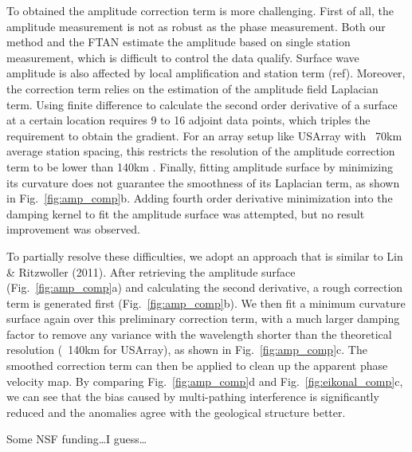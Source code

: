 \documentclass[referee]{gji}
\begin{document}
To obtained the amplitude correction term is more challenging. First of all, the amplitude measurement is not as robust as the phase measurement. Both our method and the FTAN estimate the amplitude based on single station measurement, which is difficult to control the data qualify. Surface wave amplitude is also affected by local amplification and station term (ref). Moreover, the correction term  relies on the estimation of the amplitude field Laplacian term. Using finite difference to calculate the second order derivative of a surface at a certain location requires 9 to 16 adjoint data points, which triples the requirement to obtain the gradient. For an array setup like USArray with ~70km average station spacing, this restricts the resolution of the amplitude correction term to be lower than 140km \cite{Lin:2011fw}. Finally, fitting amplitude surface by minimizing its curvature does not guarantee the smoothness of its Laplacian term, as shown in Fig.~\ref{fig:amp_comp}b. Adding fourth order derivative minimization into the damping kernel to fit the amplitude surface was attempted, but no result improvement was observed.

To partially resolve these difficulties, we adopt an approach that is similar to Lin \& Ritzwoller (2011). After retrieving the amplitude surface (Fig.~\ref{fig:amp_comp}a) and calculating the second derivative, a rough correction term is generated first (Fig.~\ref{fig:amp_comp}b). We then fit a minimum curvature surface again over this preliminary correction term, with a much larger damping factor to remove any variance with the wavelength shorter than the theoretical resolution (~140km for USArray), as shown in Fig.~\ref{fig:amp_comp}c. The smoothed correction term can then be applied to clean up the apparent phase velocity map. By comparing Fig.~\ref{fig:amp_comp}d and Fig.~\ref{fig:eikonal_comp}c, we can see that the bias caused by multi-pathing interference is significantly reduced and the anomalies agree with the geological structure better. 

\begin{acknowledgments}
	Some NSF funding\ldots I guess\ldots
\end{acknowledgments}
\end{document}
